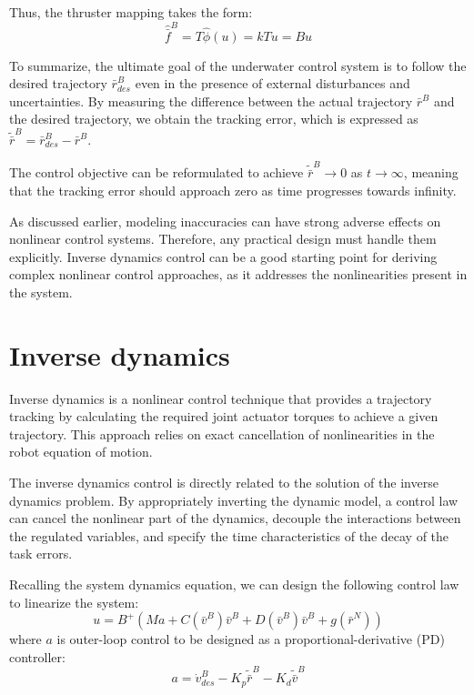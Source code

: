     Thus, the thruster mapping takes the form:
    $$
    \hat{\bar{f}}^B=T\hat{\phi}(u) = kTu = Bu
    $$

    To summarize, the ultimate goal of the underwater control system is to follow the desired 
    trajectory ${\bar r}_{des}^B$ even in the presence of external disturbances and uncertainties. 
    By measuring the difference between the actual trajectory ${\bar r}^B$ and the desired trajectory, 
    we obtain the tracking error, which is expressed as ${\tilde{\bar r}}^B = {\bar r}_{des}^B - {\bar r}^B$. 
    
    The control objective can be reformulated to achieve ${\tilde{\bar r}}^B\rightarrow 0 $ as $t\rightarrow \infty$, 
    meaning that the tracking error should approach zero as time progresses towards infinity.

    As discussed earlier, modeling inaccuracies can have strong adverse effects on nonlinear 
    control systems. Therefore, any practical design must handle them explicitly. 
    Inverse dynamics control can be a good starting point for deriving complex nonlinear 
    control approaches, as it addresses the nonlinearities present in the system.

\section{Inverse dynamics}

    Inverse dynamics is a nonlinear control technique that provides a trajectory tracking
    by calculating the required joint actuator torques to achieve a given trajectory. 
    This approach relies on exact cancellation of nonlinearities in the robot equation of motion.

    The inverse dynamics control is directly related to the solution of the inverse
    dynamics problem. By appropriately inverting the dynamic model, a control law can 
    cancel the nonlinear part of the dynamics, decouple the interactions 
    between the regulated variables, and specify the time characteristics of the decay of the 
    task errors.

    Recalling the system dynamics equation, we can design the following control law to 
    linearize the system:
    $$
        u = B^{+}(Ma +
        C(\bar{v}^B)\bar{v}^B +
        D(\bar{v}^B)\bar{v}^B +
        g(\bar{r}^N))
    $$
    where ${a}$ is outer-loop control to be designed as a proportional-derivative (PD) controller:
    $$
    a = \dot{v}_{des}^B - K_p \tilde{{\bar{r}}}^B - K_d \tilde{{\bar{v}}}^B
    $$ 

